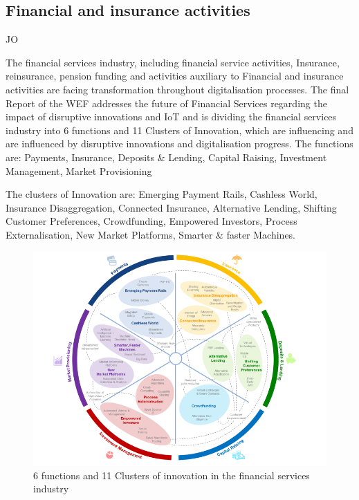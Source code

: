 \subsection{Financial and insurance activities}
JO

The financial services industry, including financial service activities, Insurance, reinsurance, pension funding and activities auxiliary to Financial and insurance activities \citeauthor{ISIC:2008} are facing transformation throughout digitalisation processes. The final Report of the \ac{WEF} addresses the future of Financial Services regarding the impact of disruptive innovations and \ac{IoT} \citeauthor{WEF-futureFinancialServices} and is dividing the financial services industry into 6 functions and 11 Clusters of Innovation, which are influencing and are influenced by disruptive innovations and digitalisation progress.
The functions are:
Payments, Insurance, Deposits & Lending, Capital Raising, Investment Management, Market Provisioning

The clusters of Innovation are:
Emerging Payment Rails, Cashless World, Insurance Disaggregation, Connected Insurance, Alternative Lending, Shifting Customer Preferences, Crowdfunding, Empowered Investors, Process Externalisation, New Market Platforms, Smarter & faster Machines.

\begin{figure}[H]
\centering
\includegraphics[width=1\columnwidth]{images/industry-financial-services-6segments_wef-copyright.PNG}
\caption{6 functions and 11 Clusters of innovation in the financial services industry}
\end{figure}


